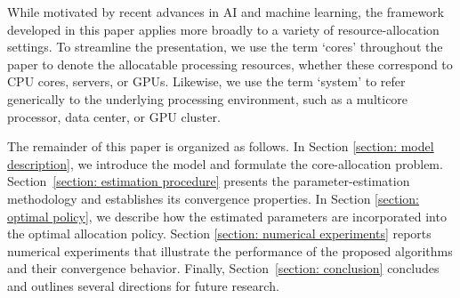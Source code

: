 \documentclass[11pt]{article}
\newcommand{\jpblue}[1]{{\color{blue} #1}}
\theoremstyle{remark}
\theoremstyle{definition}
\numberwithin{equation}{section}
\begin{document}
While motivated by recent advances in AI and machine learning, the framework developed in this paper applies more broadly to a variety of resource-allocation settings. To streamline the presentation, we use the term `cores' throughout the paper to denote the allocatable processing resources, whether these correspond to CPU cores, servers, or GPUs. Likewise, we use the term `system' to refer generically to the underlying processing environment, such as a multicore processor, data center, or GPU cluster.


The remainder of this paper is organized as follows. In Section \ref{section: model description}, we introduce the model and formulate the core-allocation problem. Section~\ref{section: estimation procedure} presents the parameter-estimation methodology and establishes its convergence properties. In Section \ref{section: optimal policy}, we describe how the estimated parameters are incorporated into the optimal allocation policy. Section \ref{section: numerical experiments} reports numerical experiments that illustrate the performance of the proposed algorithms and their convergence behavior. Finally, Section~\ref{section: conclusion} concludes and outlines several directions for future research.





\end{document}
